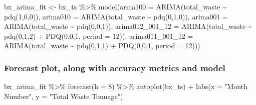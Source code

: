\documentclass[
]{article}
\newenvironment{Shaded}{\begin{snugshade}}{\end{snugshade}}
\newcommand{\AttributeTok}[1]{\textcolor[rgb]{0.77,0.63,0.00}{#1}}
\newcommand{\DecValTok}[1]{\textcolor[rgb]{0.00,0.00,0.81}{#1}}
\newcommand{\FunctionTok}[1]{\textcolor[rgb]{0.00,0.00,0.00}{#1}}
\newcommand{\NormalTok}[1]{#1}
\newcommand{\OtherTok}[1]{\textcolor[rgb]{0.56,0.35,0.01}{#1}}
\newcommand{\SpecialCharTok}[1]{\textcolor[rgb]{0.00,0.00,0.00}{#1}}
\newcommand{\StringTok}[1]{\textcolor[rgb]{0.31,0.60,0.02}{#1}}
\begin{document}
\begin{Shaded}
\begin{Highlighting}[]
\NormalTok{bx\_arima\_fit }\OtherTok{\textless{}{-}}\NormalTok{ bx\_ts }\SpecialCharTok{\%\textgreater{}\%} \FunctionTok{model}\NormalTok{(}\AttributeTok{arma100 =} \FunctionTok{ARIMA}\NormalTok{(total\_waste }\SpecialCharTok{\textasciitilde{}} \FunctionTok{pdq}\NormalTok{(}\DecValTok{1}\NormalTok{,}\DecValTok{0}\NormalTok{,}\DecValTok{0}\NormalTok{)),}
                \AttributeTok{arima010 =} \FunctionTok{ARIMA}\NormalTok{(total\_waste }\SpecialCharTok{\textasciitilde{}} \FunctionTok{pdq}\NormalTok{(}\DecValTok{0}\NormalTok{,}\DecValTok{1}\NormalTok{,}\DecValTok{0}\NormalTok{)),}
                \AttributeTok{arima001 =} \FunctionTok{ARIMA}\NormalTok{(total\_waste }\SpecialCharTok{\textasciitilde{}} \FunctionTok{pdq}\NormalTok{(}\DecValTok{0}\NormalTok{,}\DecValTok{0}\NormalTok{,}\DecValTok{1}\NormalTok{)),}
                \AttributeTok{arima012\_001\_12 =} \FunctionTok{ARIMA}\NormalTok{(total\_waste }\SpecialCharTok{\textasciitilde{}} \FunctionTok{pdq}\NormalTok{(}\DecValTok{0}\NormalTok{,}\DecValTok{1}\NormalTok{,}\DecValTok{2}\NormalTok{) }\SpecialCharTok{+} \FunctionTok{PDQ}\NormalTok{(}\DecValTok{0}\NormalTok{,}\DecValTok{0}\NormalTok{,}\DecValTok{1}\NormalTok{, }\AttributeTok{period =} \DecValTok{12}\NormalTok{)),}
                \AttributeTok{arima011\_001\_12 =} \FunctionTok{ARIMA}\NormalTok{(total\_waste }\SpecialCharTok{\textasciitilde{}} \FunctionTok{pdq}\NormalTok{(}\DecValTok{0}\NormalTok{,}\DecValTok{1}\NormalTok{,}\DecValTok{1}\NormalTok{) }\SpecialCharTok{+} \FunctionTok{PDQ}\NormalTok{(}\DecValTok{0}\NormalTok{,}\DecValTok{0}\NormalTok{,}\DecValTok{1}\NormalTok{, }\AttributeTok{period =} \DecValTok{12}\NormalTok{)))}
\end{Highlighting}
\end{Shaded}

\hypertarget{forecast-plot-along-with-accuracy-metrics-and-model}{%
\subsubsection{Forecast plot, along with accuracy metrics and
model}\label{forecast-plot-along-with-accuracy-metrics-and-model}}

\begin{Shaded}
\begin{Highlighting}[]
\NormalTok{bx\_arima\_fit }\SpecialCharTok{\%\textgreater{}\%} \FunctionTok{forecast}\NormalTok{(}\AttributeTok{h =} \DecValTok{8}\NormalTok{) }\SpecialCharTok{\%\textgreater{}\%} \FunctionTok{autoplot}\NormalTok{(bx\_ts) }\SpecialCharTok{+} \FunctionTok{labs}\NormalTok{(}\AttributeTok{x =} \StringTok{"Month Number"}\NormalTok{, }
                                                            \AttributeTok{y =} \StringTok{"Total Waste Tonnage"}\NormalTok{)}
\end{Highlighting}
\end{Shaded}
\end{document}
